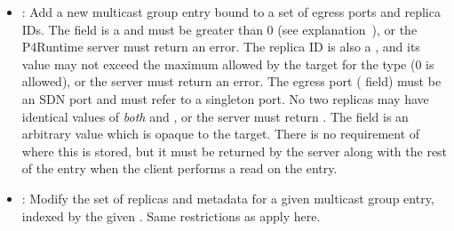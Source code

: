 \documentclass[11pt]{article}
\begin{document}
{\begin{itemize}[noitemsep,topsep=\mdcompacttopsep]
\item{}: Add a new multicast group entry bound to a set of egress ports and
replica IDs. The  field is a  and must be greater
than 0 (see explanation~), or the
P4Runtime server must return an  error. The replica
 ID is also a , and its value may not exceed the maximum
allowed by the target for the  type (0 is allowed), or the
server must return an  error. The egress port ( field)
must be an SDN port and must refer to a singleton port. No two replicas may
have identical values of \emph{both}  and , or the server must
return . The  field is an arbitrary  value
which is opaque to the target. There is no requirement of where this is
stored, but it must be returned by the server along with the rest of the entry
when the client performs a read on the entry.%

\item{}: Modify the set of replicas and metadata for a given multicast group
entry, indexed by the given . Same restrictions as
 apply here.%


\end{itemize}}
\end{document}
